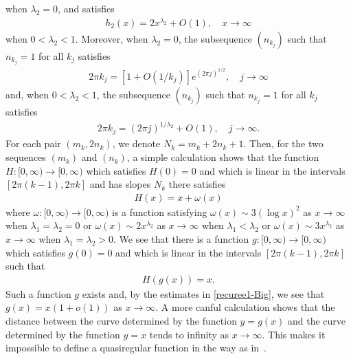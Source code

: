 \documentclass[12pt]{amsart}
\numberwithin{equation}{section}
\begin{document}
when $\lambda_2=0$, and satisfies
\begin{equation*}%
\begin{split}
h_2(x)=2x^{\lambda_2}+O(1), \quad x\to\infty
\end{split}
\end{equation*}
when $0<\lambda_2<1$. Moreover, when $\lambda_2=0$, the subsequence $(n_{k_j})$ such that $n_{k_j}=1$ for all $k_j$ satisfies
\begin{equation*}%
\begin{split}
2\pi k_{j}=\left[1+O\left(1/k_j\right)\right]e^{(2\pi j)^{1/2}}, \quad j\to\infty
\end{split}
\end{equation*}
and, when $0<\lambda_2<1$, the subsequence $(n_{k_j})$ such that $n_{k_j}=1$ for all $k_j$ satisfies
\begin{equation*}%
\begin{split}
2\pi k_{j}=(2\pi j)^{1/\lambda_2}+O(1), \quad j\to\infty.
\end{split}
\end{equation*}
For each pair $(m_k,2n_k)$, we denote $N_k=m_k+2n_k+1$. Then, for the two sequences $(m_k)$ and $(n_k)$, a simple calculation shows that the function $H:[0,\infty)\to[0,\infty)$ which satisfies $H(0)=0$ and which is linear in the intervals $[2\pi (k-1), 2\pi k]$ and has slopes $N_k$ there satisfies
\begin{equation}\label{recuree1-Big}
\begin{split}
H(x)=x+\omega(x)
\end{split}
\end{equation}
where $\omega:[0,\infty)\to[0,\infty)$ is a function satisfying $\omega(x) \sim 3(\log x)^2$ as $x\to\infty$ when $\lambda_1=\lambda_2=0$ or $\omega(x) \sim 2x^{\lambda_2}$ as $x\to\infty$ when $\lambda_1<\lambda_2$ or $\omega(x) \sim 3x^{\lambda_2}$ as $x\to\infty$ when $\lambda_1=\lambda_2>0$. We see that there is a function $g:[0,\infty)\to[0,\infty)$ which satisfies $g(0)=0$ and which is linear in the intervals $[2\pi (k-1), 2\pi k]$ such that
\begin{equation*}%
\begin{split}
H(g(x))=x.
\end{split}
\end{equation*}
Such a function $g$ exists and, by the estimates in \eqref{recuree1-Big}, we see that $g(x)=x(1+o(1))$ as $x\to\infty$. A more canful calculation shows that the distance between the curve determined by the function $y=g(x)$ and the curve determined by the function $y=x$ tends to infinity as $x\to\infty$. This makes it impossible to define a quasiregular function in the way as in~\cite[Subsection~2.2]{Zhang2024}.
\end{document}
